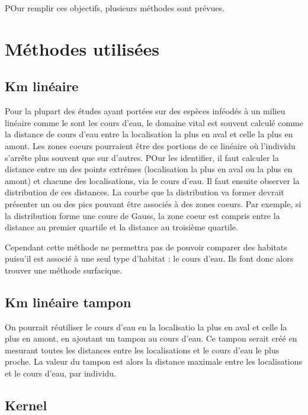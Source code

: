 \documentclass[
  letterpaper,
  DIV=11,
  numbers=noendperiod]{scrreprt}
\begin{document}
POur remplir ces objectifs, plusieurs méthodes sont prévues.

\section{Méthodes utilisées}\label{muxe9thodes-utilisuxe9es}

\subsection{Km linéaire}\label{km-linuxe9aire}

Pour la plupart des études ayant portées sur des espèces inféodés à un
milieu linéaire comme le sont les cours d'eau, le domaine vital est
souvent calculé comme la distance de cours d'eau entre la localisation
la plus en aval et celle la plus en amont. Les zones coeurs pourraient
être des portions de ce linéaire où l'individu s'arrête plus souvent que
sur d'autres. POur les identifier, il faut calculer la distance entre un
des points extrêmes (localisation la plus en aval ou la plus en amont)
et chacune des localisations, via le cours d'eau. Il faut ensuite
observer la distribution de ces distances. La courbe que la distribution
va former devrait présenter un ou des pics pouvant être associés à des
zones coeurs. Par exemple, si la distribution forme une coure de Gauss,
la zone coeur est compris entre la distance au premier quartile et la
distance au troisième quartile.

Cependant cette méthode ne permettra pas de pouvoir comparer des
habitats puisu'il est associé à une seul type d'habitat : le cours
d'eau. Ils font donc alors trouver une méthode surfacique.

\subsection{Km linéaire tampon}\label{km-linuxe9aire-tampon}

On pourrait réutiliser le cours d'eau en la localisatio la plus en aval
et celle la plus en amont, en ajoutant un tampon au cours d'eau. Ce
tampon serait créé en mesurant toutes les distances entre les
localisations et le cours d'eau le plus proche. La valeur du tampon est
alors la distance maximale entre les localisations et le cours d'eau,
par individu.

\subsection{Kernel}\label{kernel}
\end{document}
